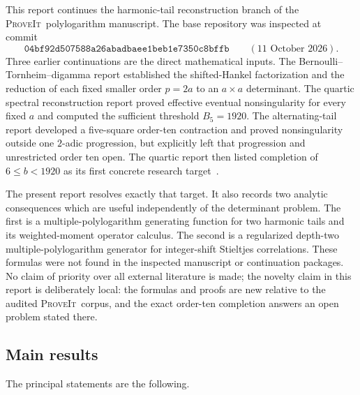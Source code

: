 \documentclass[11pt]{article}
\theoremstyle{definition}
\newcommand{\Repo}{\textsc{ProveIt}}
\begin{document}
This report continues the harmonic-tail reconstruction branch of the
\Repo\ polylogarithm manuscript.  The base repository was inspected at
commit~\cite{Repo}
\[
 \texttt{04bf92d507588a26abadbaee1beb1e7350c8bffb}
 \qquad (11\text{ October }2026).
\]
Three earlier continuations are the direct mathematical inputs.
The Bernoulli--Tornheim--digamma report established the shifted-Hankel
factorization and the reduction of each fixed smaller order $p=2a$ to
an $a\times a$ determinant.  The quartic spectral reconstruction
report proved effective eventual nonsingularity for every fixed $a$ and
computed the sufficient threshold $B_5=1920$.  The alternating-tail
report developed a five-square order-ten contraction and proved
nonsingularity outside one $2$-adic progression, but explicitly left
that progression and unrestricted order ten open.  The quartic report
then listed completion of $6\le b<1920$ as its first concrete research
target~\cite{BTD,QSR,ATSD}.

The present report resolves exactly that target.  It also records two
analytic consequences which are useful independently of the determinant
problem.  The first is a multiple-polylogarithm generating function for
two harmonic tails and its weighted-moment operator calculus.  The
second is a regularized depth-two multiple-polylogarithm generator for
integer-shift Stieltjes correlations.  These formulas were not found in
the inspected manuscript or continuation packages.  No claim of
priority over all external literature is made; the novelty claim in this
report is deliberately local: the formulas and proofs are new relative
to the audited \Repo\ corpus, and the exact order-ten completion answers
an open problem stated there.

\subsection{Main results}

The principal statements are the following.
\end{document}
